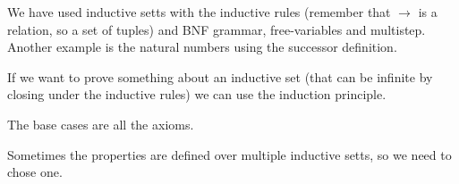 
We have used inductive setts with the inductive rules (remember that $ \to $ is a relation, so a set of tuples) and BNF grammar, free-variables and multistep. Another example is the natural numbers using the successor definition.

If we want to prove something about an inductive set (that can be infinite by closing under the inductive rules) we can use the induction principle.

The base cases are all the axioms.

Sometimes the properties are defined over multiple inductive setts, so we need to chose one. 

% 
